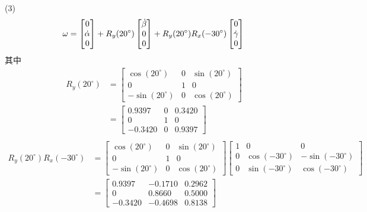 \documentclass[UTF8, 12pt]{ctexart}
\begin{document}
(3)
\[
    \omega = \begin{bmatrix}
                0 \\ \dot{\alpha} \\ 0
            \end{bmatrix} 
            + R_y(20^\circ) \begin{bmatrix}
                \dot{\beta} \\ 0 \\ 0
            \end{bmatrix}
            + R_y(20^\circ) R_x(-30^\circ) \begin{bmatrix}
                0 \\ \dot{\gamma} \\ 0
            \end{bmatrix} \\
\]
其中
\[
\begin{aligned}
    R_y(20^\circ) &= 
        \begin{bmatrix}
            \cos(20^\circ) & 0 & \sin(20^\circ) \\
            0 & 1 & 0 \\
            -\sin(20^\circ) & 0 & \cos(20^\circ)
        \end{bmatrix} \\
        &=
        \begin{bmatrix}
            0.9397 & 0 & 0.3420 \\
            0 & 1 & 0 \\
            -0.3420 & 0 & 0.9397
        \end{bmatrix} \\
\end{aligned} 
\]
\[
\begin{aligned}
    R_y(20^\circ) R_x(-30^\circ) &=
        \begin{bmatrix}
            \cos(20^\circ) & 0 & \sin(20^\circ) \\
            0 & 1 & 0 \\
            -\sin(20^\circ) & 0 & \cos(20^\circ)
        \end{bmatrix}
        \begin{bmatrix}
            1 & 0 & 0 \\
            0 & \cos(-30^\circ) & -\sin(-30^\circ) \\
            0 & \sin(-30^\circ) & \cos(-30^\circ)
        \end{bmatrix} \\
        &=
        \begin{bmatrix}
            0.9397 & -0.1710 & 0.2962 \\
            0 & 0.8660 & 0.5000 \\
            -0.3420 & -0.4698 & 0.8138
        \end{bmatrix} \\
\end{aligned}
\]
\end{document}
